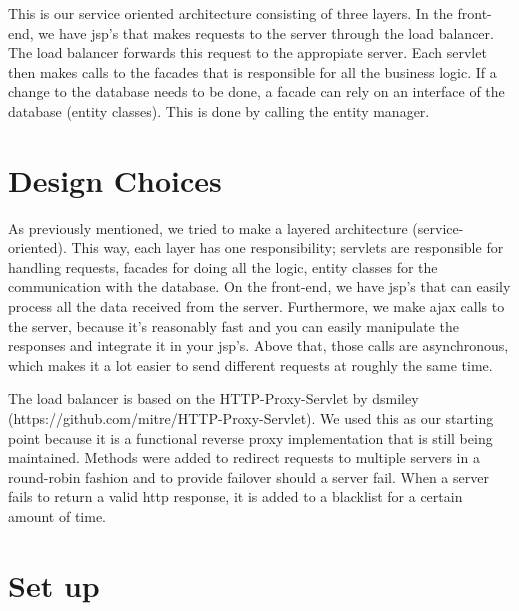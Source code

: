\documentclass[11pt]{article}
\begin{document}
This is our service oriented architecture consisting of three layers. In the front-end, we have jsp's that makes requests to the server through the load balancer. The load balancer forwards this request to the appropiate server. Each servlet then makes calls to the facades that is responsible for all the business logic. If a change to the database needs to be done, a facade can rely on an interface of the database (entity classes). This is done by calling the entity manager.

\section{Design Choices}

As previously mentioned, we tried to make a layered architecture (service-oriented). This way, each layer has one responsibility; servlets are responsible for handling requests, facades for doing all the logic, entity classes for the communication with the database. On the front-end, we have jsp's that can easily process all the data received from the server. Furthermore, we make ajax calls to the server, because it's reasonably fast and you can easily manipulate the responses and integrate it in your jsp's. Above that, those calls are asynchronous, which makes it a lot easier to send different requests at roughly the same time.

The load balancer is based on the HTTP-Proxy-Servlet by dsmiley (https://github.com/mitre/HTTP-Proxy-Servlet). We used this as our starting point because it is a functional reverse proxy implementation that is still being maintained. Methods were added to redirect requests to multiple servers in a round-robin fashion and to provide failover should a server fail. When a server fails to return a valid http response, it is added to a blacklist for a certain amount of time.

\section{Set up}
\end{document}
